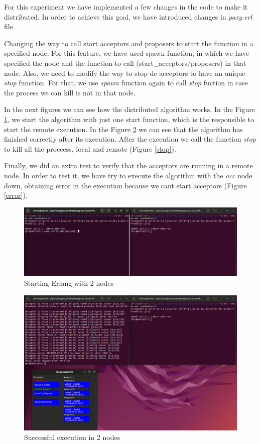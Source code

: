 \documentclass[a4paper, 10pt]{article}
\begin{document}
For this experiment we have implemented a few changes in the code to make it distributed. In order to achieve this goal, we have introduced changes in \textit{paxy.erl} file.

Changing the way to call start acceptors and proposers to start the function in a specified node. For this feature, we have used spawn function, in which we have specified the node and the function to call (start\_acceptors/proposers) in that node. Also, we need to modify the way to stop de acceptors to have an unique \textit{stop} function. For that, we use \textit{spawn} function again to call \textit{stop} fuction in case the process we can kill is not in that node.

In the next figures we can see how the distributed algorithm works. In the Figure \ref{start}, we start the algorithm with just one start function, which is the responsible to start the remote execution. In the Figure \ref{execution} we can see that the algorithm has finished correctly after its execution. After the execution we call the function \textit{stop} to kill all the proccess, local and remote (Figure \ref{stop}). 

Finally, we did an extra test to verify that the acceptors are running in a remote node. In order to test it, we have try to execute the algorithm with the \textit{acc} node down, obtaining error in the execution because we cant start acceptors (Figure \ref{error}).

\begin{figure}[H]
  \centering
  \includegraphics[width=.85\linewidth]{images/remoteStart2nodes.png}
    \caption{Starting Erlang with 2 nodes}
    \label{start}
\end{figure} 


\begin{figure}[H]
  \centering
  \includegraphics[width=.65\linewidth]{images/remoteExecution.png}
    \caption{Successful execution in 2 nodes}
    \label{execution}
\end{figure} 
\end{document}
